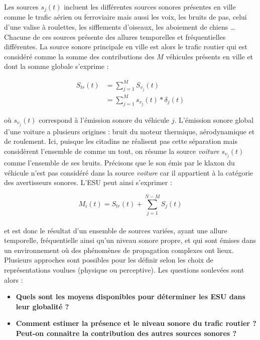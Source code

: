 Les sources $s_j(t)$ incluent les différentes sources sonores présentes en ville comme le trafic aérien ou ferroviaire mais aussi les voix, les bruits de pas, celui d'une valise à roulettes, les sifflements d'oiseaux, les aboiement de chiens \dots{} Chacune de ces sources présente des allures temporelles et fréquentielles différentes. La source sonore principale en ville est alors le trafic routier qui est considéré comme la somme des contributions des $M$ véhicules présents en ville et dont la somme globale s'exprime :

\begin{subequations}
\begin{align}
S_{tr}(t) &= \sum_{j = 1}^M S_{v_j}(t)\\
 & = \sum_{j = 1}^M s_{v_j}(t) \ast \delta_{j}(t)
\end{align}
\end{subequations}

où $s_{v_j}(t)$ correspond à l'émission sonore du véhicule $j$. L'émission sonore global d'une voiture a plusieurs origines : bruit du moteur thermique, aérodynamique et de roulement. Ici, puisque les citadins ne réalisent pas cette séparation mais considèrent l'ensemble de comme un tout, on résume la source \textit{voiture} $s_{v_j}(t)$ comme l'ensemble de ses bruits. Précisons que le son émis par le klaxon du véhicule n'est pas considéré dans la source \textit{voiture} car il appartient à la catégorie des avertisseurs sonores.
L'ESU peut ainsi s'exprimer : 

\begin{equation}
M_i(t) = S_{tr}(t)+\sum_{j = 1}^{N-M}S_j(t)
\end{equation}
\\

et est donc le résultat d'un ensemble de sources variées, ayant une allure temporelle, fréquentielle ainsi qu'un niveau sonore propre, et qui sont émises dans un environnement où des phénomènes de propagation complexes ont lieux. Plusieurs approches sont possibles pour les définir selon les choix de représentations voulues (physique ou perceptive). Les questions soulevées sont alors : 
 
\begin{itemize}
\item \textbf{Quels sont les moyens disponibles pour déterminer les ESU dans leur globalité ?}
\item \textbf{Comment estimer la présence et le niveau sonore du trafic routier ? Peut-on connaitre la contribution des autres sources sonores ?}\\
\end{itemize}

